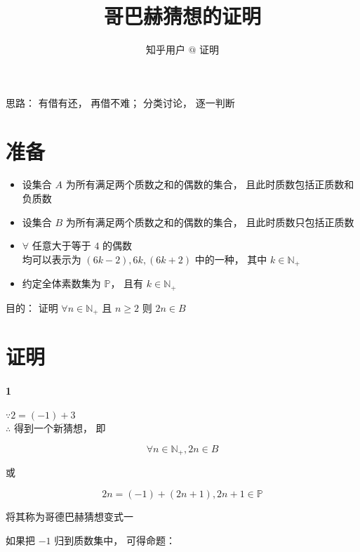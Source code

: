 \documentclass[11pt]{article}
\title{哥巴赫猜想的证明}
\author{知乎用户 $\textbf{@ 证明}$}
\begin{document}
\maketitle

\begin{center}
	思路： 有借有还， 再借不难； 分类讨论， 逐一判断
\end{center}

\section{准备}

\begin{itemize}
	\item 设集合 $\textit{A}$ 为所有满足两个质数之和的偶数的集合， 且此时质数包括正质数和负质数
	\item 设集合 $\textit{B}$ 为所有满足两个质数之和的偶数的集合， 且此时质数只包括正质数
	\item $\forall$ 任意大于等于 $4$ 的偶数 \\ 均可以表示为 $(6k-2), 6k, (6k + 2)$ 中的一种， 其中 $k\in\mathbb{N}_+$
	\item 约定全体素数集为 $\mathbb{P}$， 且有 $k\in\mathbb{N}_+$
\end{itemize}

目的： 证明 $\forall{n}\in\mathbb{N}_+$ 且 $n\ge2$ 则 $2n\in{B}$

\section{证明}

\paragraph{1}

$\because{2=(-1)+3}$ \\
$\therefore$ 得到一个新猜想， 即

\begin{equation}
	\forall{n}\in\mathbb{N}_+,2n\in{B}
\end{equation}

或

\begin{equation}
	2n=(-1)+(2n+1),2n+1\in\mathbb{P}
\end{equation}

将其称为哥德巴赫猜想变式一

\pagebreak

如果把 $-1$ 归到质数集中， 可得命题：
\end{document}
